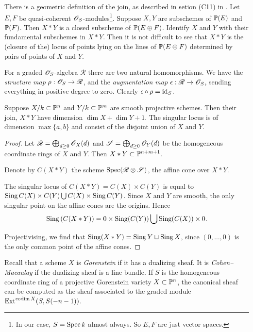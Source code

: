 There is a geometric definition of the join, as described in setion (C11) in \cite{altman_joins}. Let $E,F$ be quasi-coherent $\OO_S$-modules\footnote{In our case, $S=\Spec k$ almost always. So $E,F$ are just vector spaces.}. Suppose $X,Y$ are subschemes of $\P(E)$ and $\P(F)$. Then $X\ast Y$ is a closed subscheme of $\P(E \oplus F)$. Identify $X$ and $Y$ with their fundamental subschemes in $X \ast Y$. Then it is not difficult to see that $X \ast Y$ is the (closure of the) locus of points lying on the lines of $\P(E \oplus F)$ determined by pairs of points of $X$ and $Y$. 

For a graded $\OO_S$-algebra $\mathscr R$ there are two natural homomorphisms. We have the \emph{structure map} $\rho: \OO_S \to \mathscr R$, and the \emph{augmentation map} $\epsilon: \mathscr R \to \OO_S$, sending everything in positive degree to zero. Clearly $\epsilon \circ \rho = \id_S$.


\begin{proposition}
\label{lemma:join}
Suppose $X/k \subset \P^n$ and $Y/k \subset \P^m$ are smooth projective schemes. Then their join, $X \ast Y$ have dimension $\dim X+\dim Y+1$. The singular locus is of dimension $\max\{a,b\}$ and consist of the disjoint union of $X$ and $Y$.
\end{proposition}
\begin{proof}
Let $\mathscr R = \bigoplus_{d \geq 0} \OO_X(d)$ and $\mathscr S = \bigoplus_{d \geq 0} \OO_Y(d)$ be the homogeneous coordinate rings of $X$ and $Y$. Then $X \ast Y \subset \P^{n+m+1}$. 

Denote by $C(X \ast Y)$ the scheme $\Spec (\mathscr R \otimes \mathscr S)$, the affine cone over $X \ast Y$. 

The singular locus of $C(X \ast Y) = C(X) \times C(Y)$ is equal to $\Sing C(X) \times C(Y) \bigcup C(X) \times \Sing C(Y)$. Since $X$ and $Y$ are smooth, the only singular point on the affine cones are the origins. Hence
$$
\Sing\left(C(X \ast Y)\right) = 0 \times \Sing(C(Y)) \bigcup \Sing(C(X)) \times 0.
$$

Projectivising, we find that $\Sing(X \ast Y) = \Sing Y \sqcup \Sing X$, since $(0,\ldots,0)$ is the only common point of the affine cones. 
\end{proof}

Recall that a scheme $X$ is \emph{Gorenstein} if it has a dualizing sheaf. It is \emph{Cohen--Macaulay} if the dualizing sheaf is a line bundle. If $S$ is the homogeneous coordinate ring of a projective Gorenstein variety $X \subset \P^n$, the canonical sheaf can be computed as the sheaf associated to the graded module $\Ext^{\codim X}(S,S(-n-1))$. 

